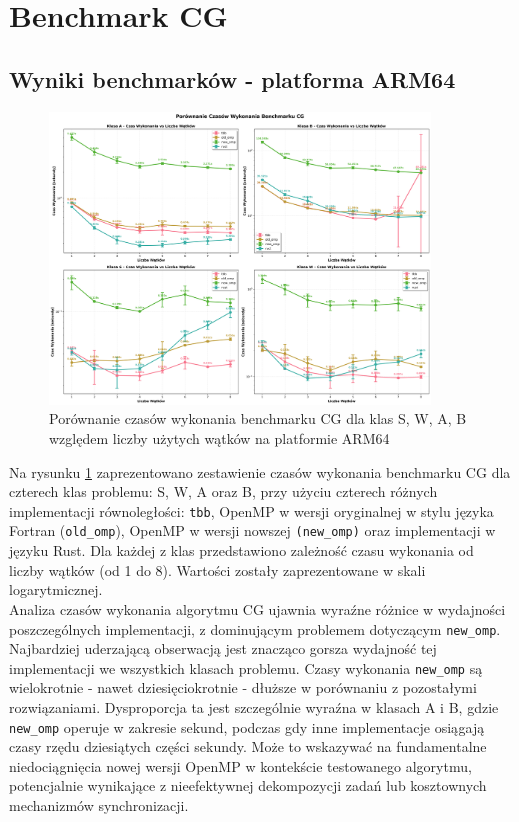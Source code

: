 \section{Benchmark CG}
\subsection{Wyniki benchmarków - platforma ARM64}

\begin{figure}[!h]
    \centering
    \includegraphics[width=0.9\textwidth]{analiza/images/parallel/cg/arm/cg_porownanie_czasow_wykonania.png}
    \caption{Porównanie czasów wykonania benchmarku CG dla klas S, W, A, B względem liczby użytych wątków na platformie ARM64}
    \label{cg_porownanie_czasow_wykonania}
\end{figure}

Na rysunku \ref{cg_porownanie_czasow_wykonania} zaprezentowano zestawienie czasów wykonania benchmarku CG dla czterech klas problemu: S, W, A oraz B, przy użyciu czterech różnych implementacji równoległości: \texttt{tbb}, OpenMP w wersji oryginalnej w stylu języka Fortran (\texttt{old\_omp}), OpenMP w wersji nowszej \texttt{(\texttt{new\_omp})} oraz implementacji w języku Rust. Dla każdej z klas przedstawiono zależność czasu wykonania od liczby wątków (od 1 do 8). Wartości zostały zaprezentowane w skali logarytmicznej.\\
Analiza czasów wykonania algorytmu CG ujawnia wyraźne różnice w wydajności poszczególnych implementacji, z dominującym problemem dotyczącym \texttt{new\_omp}. Najbardziej uderzającą obserwacją jest znacząco gorsza wydajność tej implementacji we wszystkich klasach problemu. Czasy wykonania \texttt{new\_omp} są wielokrotnie - nawet dziesięciokrotnie - dłuższe w porównaniu z pozostałymi rozwiązaniami. Dysproporcja ta jest szczególnie wyraźna w klasach A i B, gdzie \texttt{new\_omp} operuje w zakresie sekund, podczas gdy inne implementacje osiągają czasy rzędu dziesiątych części sekundy. Może to wskazywać na fundamentalne niedociągnięcia nowej wersji OpenMP w kontekście testowanego algorytmu, potencjalnie wynikające z nieefektywnej dekompozycji zadań lub kosztownych mechanizmów synchronizacji.

